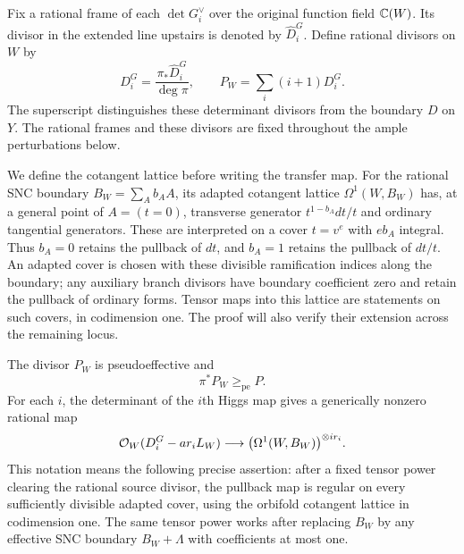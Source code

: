 Fix a rational frame of each $\det G_i^\vee$ over the original function
field $\mathbb C(W)$.  Its divisor in the extended line upstairs is denoted by
$\widehat D_i^G$.  Define rational divisors on $W$ by
\begin{equation}\label{eq:nonvanishing-determinants}
 D_i^G=\frac{\pi_*\widehat D_i^G}{\deg\pi},\qquad
 P_W=\sum_i(i+1)D_i^G.
\end{equation}
The superscript distinguishes these determinant divisors from the
boundary $D$ on $Y$.  The rational frames and these divisors are fixed
throughout the ample perturbations below.

We define the cotangent lattice before writing the transfer map. For
the rational SNC boundary $B_W=\sum_A b_AA$, its adapted cotangent
lattice $\Omega^1(W,B_W)$ has, at a general point of $A=(t=0)$,
transverse generator $t^{1-b_A}dt/t$ and ordinary tangential generators.
These are interpreted on a cover $t=v^e$ with $eb_A$ integral. Thus
$b_A=0$ retains the pullback of $dt$, and $b_A=1$ retains the pullback
of $dt/t$. An adapted cover is chosen with these divisible ramification
indices along the boundary; any auxiliary branch divisors have boundary
coefficient zero and retain the pullback of ordinary forms. Tensor maps
into this lattice are statements on such covers, in codimension one.
The proof will also verify their extension across the remaining locus.

\begin{lemma}\label{lem:orbifold-transfer}
The divisor $P_W$ is pseudoeffective and
\begin{equation}\label{eq:nonvanishing-pushdown}
                    \pi^*P_W\ge_{\mathrm{pe}}P.
\end{equation}
For each $i$, the determinant of the $i$th Higgs map gives a generically
nonzero rational map
\begin{equation}\label{eq:nonvanishing-orbifold-map}
 \mathcal O_W(D_i^G-ar_iL_W)
       \longrightarrow \bigl(\Omega^1(W,B_W)\bigr)^{\otimes ir_i}.
\end{equation}
This notation means the following precise assertion: after a fixed
tensor power clearing the rational source divisor, the pullback map is
regular on every sufficiently divisible adapted cover, using the
orbifold cotangent lattice in codimension one.  The same tensor power
works after replacing $B_W$ by any effective SNC boundary
$B_W+\Lambda$ with coefficients at most one.
\end{lemma}

